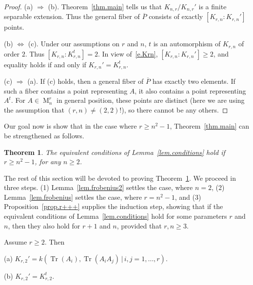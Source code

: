 \documentclass[12pt]{amsart}
\numberwithin{equation}{section}
\numberwithin{subsection}{section}
\newtheorem{theorem}{Theorem}[section]
\theoremstyle{definition} \newtheorem{definition}[theorem]{Definition}
\newcommand{\tr}{\operatorname{Tr}}
\newcommand{\Mat}{\operatorname{M}}
\begin{document}
\begin{proof} 
(a) $\Longrightarrow$ (b).
Theorem~\ref{thm.main} tells us that $K_{n, r}/K_{n, r}'$ is a finite 
separable extension. Thus the general fiber of $\overline{P}$
consists of exactly $[K_{r, n} : K_{r, n}']$ points. 

\smallskip
(b) $\Longleftrightarrow$ (c).
Under our assumptions on $r$ and $n$, $t$ is an automorphism of
$K_{r, n}$ of order $2$. Thus 
$[K_{r, n} : K_{r, n}^{t}] = 2$.
In view of~\eqref{e.Krn},
$[K_{r, n} : K_{r, n}'] \geqslant 2$, 
and equality holds if and only if $K_{r, n}'= K_{r, n}^t$.

\smallskip
(c) $\Longrightarrow$ (a).
If (c) holds, then a general fiber of $\overline{P}$ 
has exactly two elements. If such a fiber contains a point 
representing $A$, it also contains a point representing $A^t$.
For $A \in \Mat_n^r$ in general position, these points 
are distinct (here we are using the assumption that $(r, n) \neq (2, 2)$!),
so there cannot be any others.
\end{proof}

Our goal now is show that in the case where $r \geqslant n^2 - 1$, 
Theorem~\ref{thm.main} can be strengthened as follows. 

\begin{theorem} \label{thm.frobenius}
The equivalent conditions of Lemma~\ref{lem.conditions}
hold if $r \geqslant n^2 - 1$, for any $n \geqslant 2$.
\end{theorem}

The rest of this section will be devoted to proving 
Theorem~\ref{thm.frobenius}. We proceed in three steps.
(1) Lemma~\ref{lem.frobenius2} settles the case, where $n = 2$,
(2) Lemma~\ref{lem.frobenius} settles the case, where $r = n^2 - 1$, and
(3) Proposition~\ref{prop.r+++} supplies the induction step, showing that
if the equivalent conditions of Lemma~\ref{lem.conditions}
hold for some parameters $r$ and $n$, then they also hold for
$r+ 1$ and $ n$, provided that $r, n \geqslant 3$.

\begin{lemma} \label{lem.frobenius2} Assume $r \geqslant 2$. Then

\smallskip
(a) $K_{r, 2}' = k(\tr(A_i), \tr(A_i A_j) \, | \, i, j = 1, \dots, r)$.

\smallskip
(b) $K_{r, 2}' = K_{r, 2}^t$.
\end{lemma}
\end{document}
